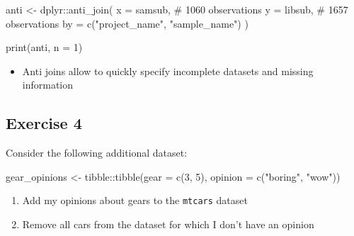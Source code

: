 \documentclass[
  letterpaper,
]{book}
\newenvironment{Shaded}{}{}
\newcommand{\AttributeTok}[1]{\textcolor[rgb]{0.84,0.23,0.29}{#1}}
\newcommand{\CommentTok}[1]{\textcolor[rgb]{0.42,0.45,0.49}{#1}}
\newcommand{\DecValTok}[1]{\textcolor[rgb]{0.00,0.36,0.77}{#1}}
\newcommand{\FunctionTok}[1]{\textcolor[rgb]{0.44,0.26,0.76}{#1}}
\newcommand{\NormalTok}[1]{\textcolor[rgb]{0.14,0.16,0.18}{#1}}
\newcommand{\OtherTok}[1]{\textcolor[rgb]{0.44,0.26,0.76}{#1}}
\newcommand{\SpecialCharTok}[1]{\textcolor[rgb]{0.00,0.36,0.77}{#1}}
\newcommand{\StringTok}[1]{\textcolor[rgb]{0.01,0.18,0.38}{#1}}
\providecommand{\tightlist}{%
  \setlength{\itemsep}{0pt}\setlength{\parskip}{0pt}}\usepackage{longtable,booktabs,array}
\begin{document}
\begin{Shaded}
\begin{Highlighting}[]
\NormalTok{anti }\OtherTok{\textless{}{-}}\NormalTok{ dplyr}\SpecialCharTok{::}\FunctionTok{anti\_join}\NormalTok{(}
  \AttributeTok{x =}\NormalTok{ samsub,                           }\CommentTok{\# 1060 observations}
  \AttributeTok{y =}\NormalTok{ libsub,                           }\CommentTok{\# 1657 observations}
  \AttributeTok{by =} \FunctionTok{c}\NormalTok{(}\StringTok{"project\_name"}\NormalTok{, }\StringTok{"sample\_name"}\NormalTok{)}
\NormalTok{)}
\end{Highlighting}
\end{Shaded}

\begin{Shaded}
\begin{Highlighting}[]
\FunctionTok{print}\NormalTok{(anti, }\AttributeTok{n =} \DecValTok{1}\NormalTok{)}
\end{Highlighting}
\end{Shaded}

\begin{itemize}
\tightlist
\item
  Anti joins allow to quickly specify incomplete datasets and missing
  information
\end{itemize}

\hypertarget{exercise-4}{%
\subsection{Exercise 4}\label{exercise-4}}

Consider the following additional dataset:

\begin{Shaded}
\begin{Highlighting}[]
\NormalTok{gear\_opinions }\OtherTok{\textless{}{-}}\NormalTok{ tibble}\SpecialCharTok{::}\FunctionTok{tibble}\NormalTok{(}\AttributeTok{gear =} \FunctionTok{c}\NormalTok{(}\DecValTok{3}\NormalTok{, }\DecValTok{5}\NormalTok{), }\AttributeTok{opinion =} \FunctionTok{c}\NormalTok{(}\StringTok{"boring"}\NormalTok{, }\StringTok{"wow"}\NormalTok{))}
\end{Highlighting}
\end{Shaded}

\begin{enumerate}
\def\labelenumi{\arabic{enumi}.}
\item
  Add my opinions about gears to the \texttt{mtcars} dataset

\begin{Shaded}
\begin{Highlighting}[]

\end{Highlighting}
\end{Shaded}
\item
  Remove all cars from the dataset for which I don't have an opinion

\begin{Shaded}
\begin{Highlighting}[]

\end{Highlighting}
\end{Shaded}
\end{enumerate}
\end{document}
